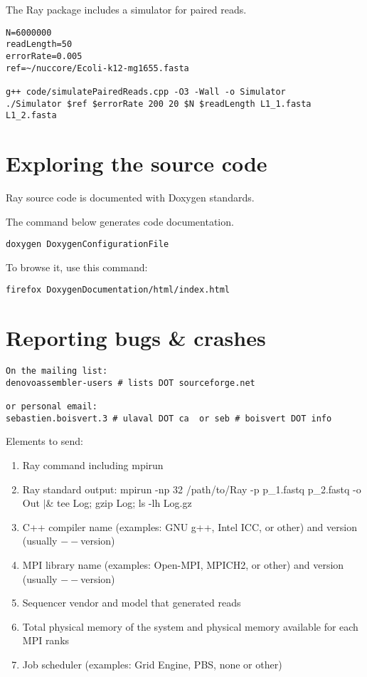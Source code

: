 \documentclass{article}
\begin{document}
The Ray package includes a simulator for paired reads.

\begin{verbatim}
N=6000000
readLength=50
errorRate=0.005
ref=~/nuccore/Ecoli-k12-mg1655.fasta

g++ code/simulatePairedReads.cpp -O3 -Wall -o Simulator 
./Simulator $ref $errorRate 200 20 $N $readLength L1_1.fasta L1_2.fasta
\end{verbatim}

\section{Exploring the source code}

Ray source code is documented with Doxygen standards.

The command below generates code documentation.

\begin{verbatim}
doxygen DoxygenConfigurationFile
\end{verbatim}

To browse it, use this command:

\begin{verbatim}
firefox DoxygenDocumentation/html/index.html
\end{verbatim}

\section{Reporting bugs \& crashes}

\begin{verbatim}
On the mailing list:
denovoassembler-users # lists DOT sourceforge.net

or personal email:
sebastien.boisvert.3 # ulaval DOT ca  or seb # boisvert DOT info
\end{verbatim}

\noindent
Elements to send:

\begin{enumerate}
 \item Ray command including mpirun
  \item Ray standard output: mpirun -np 32 /path/to/Ray -p p\_1.fastq p\_2.fastq -o Out $|$\& tee Log; gzip Log; ls -lh Log.gz
    \item  C++ compiler name (examples: GNU g++, Intel ICC, or other) and version (usually $--$version)
   \item  MPI library name (examples: Open-MPI, MPICH2, or other) and version (usually $--$version)
    \item  Sequencer vendor and model that generated reads
    \item  Total physical memory of the system and physical memory available for each MPI ranks
\item Job scheduler (examples: Grid Engine, PBS, none or other)
\end{enumerate}
\end{document}
